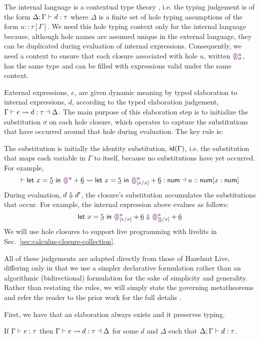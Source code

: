 The internal language is a contextual type theory \cite{Nanevski2008}, i.e. the typing judgement is
of the form $\hasTypeD{\Delta}{\Gamma}{d}{\tau}$ where $\Delta$ is a finite set of hole typing
assumptions of the form $u :: \tau[\Gamma]$.
We need this hole typing context only for the internal language because, although hole names are assumed
unique in the external language, they can be duplicated during evaluation of internal expressions.
Consequently, we need a context to ensure that each closure associated with hole $u$, written $\dehole{u}{\sigma}$,
has the same type and can be filled
with expressions valid under the same context.

External expressions, $e$, are given dynamic meaning by typed elaboration to internal expressions, $d$,
according to the typed elaboration judgement, $\elabs{\Gamma}{e}{d}{\tau}{\Delta}$.
The main purpose of this elaboration step is to initialize the substitution $\sigma$ on each hole closure,
which operates to capture
the substitutions that have occurred around that hole during evaluation. The key rule is:
\begin{mathpar}
\end{mathpar}
The substitution is initially the identity substitution, $\idof{\Gamma}$, i.e. the
substitution that maps each variable in $\Gamma$ to itself, because no substitutions have yet occurred. For example,
\[ \elabs{ }{\helet{x}{\hnum{5}}{\hehole{u}} + \hnum{6}}{\helet{x}{\hnum{5}}{\dehole{u}{[x/x]} + \hnum{6}}}{\tnum}{u :: \tnum[x : \tnum]} \]
During evaluation, $\evalsTo{d}{d'}$, the closure's substitution accumulates the substitutions that occur. For example,
the internal expression above evalues as follows:
\[
  \evalsTo{\helet{x}{\hnum{5}}{\dehole{u}{[x/x]} + \hnum{6}}}{
      \dehole{u}{[\hnum{5}/x]} + \hnum{6}
  }
\]
We will use hole closures to support live programming with livelits in Sec.~\ref{sec:calculus-closure-collection}.


All of these judgements are adapted directly from those of Hazelnut Live,
differing only in that we use a simpler declarative formulation rather than an algorithmic (bidirectional)
formulation for the sake of simplicity and generality. Rather than restating the rules, we will simply state the governing
metatheorems and refer the reader to the prior work for the full detalis \cite{HazelnutLive}.

First, we have that an elaboration always exists and it preserves typing.
\begin{theorem}
    If $\hasType{\Gamma}{e}{\tau}$ then $\elabs{\Gamma}{e}{d}{\tau}{\Delta}$ for some $d$ and $\Delta$ such
    that $\hasTypeD{\Delta}{\Gamma}{d}{\tau}$.
\end{theorem}

